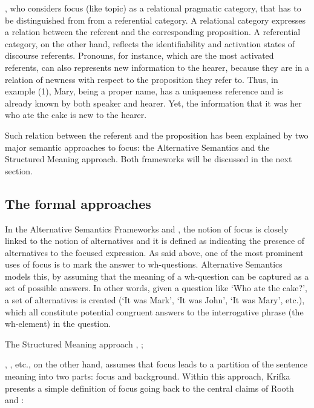 \documentclass[12pt]{report}
\begin{document}
\noindent
\cite{lambrecht1996information}, who considers focus (like topic) as a relational pragmatic category, that has to be distinguished from from a referential category. A relational category expresses a relation between the referent and the corresponding proposition. A referential category, on the other hand, reflects the identifiability and activation states of discourse referents. Pronouns, for instance, which are the most activated referents, can also represents new information to the hearer, because they are in a relation of newness with respect to the proposition they refer to. Thus, in example (1), Mary, being a proper name, has a uniqueness reference and is already known by both speaker and hearer. Yet, the information that it was her who ate the cake is new to the hearer. 

Such relation between the referent and the proposition has been explained by two major semantic approaches to focus: the Alternative Semantics and the Structured Meaning approach. Both frameworks will be discussed in the next section.\\
 
\subsection{The formal approaches} \label{formalapproaches}

In the Alternative Semantics Frameworks \cite{rooth1985association} and \cite{rooth1992theory}, the notion of focus is closely linked to the notion of alternatives and it is defined as indicating the presence of alternatives to the focused expression. As said above, one of the most prominent uses of focus is to mark the answer to wh-questions. Alternative Semantics models this, by assuming that the meaning of a wh-question can be captured as a set of possible answers. In other words, given a question like ‘Who ate the cake?', a set of alternatives is created (‘It was Mark’, ‘It was John', ‘It was Mary’, etc.), which all constitute potential congruent answers to the interrogative phrase (the wh-element) in the question. 

The Structured Meaning approach \cite{von1982structured}, \cite{von1990current};

\noindent
\cite{krifka1991compositional}, \cite{krifka2008basic}, etc., on the other hand, assumes that focus leads to a partition of the sentence meaning into two parts: focus and background. 
Within this approach, Krifka \cite{krifka2008basic} presents a simple definition of focus going back to the central claims of Rooth \cite{rooth1985association} and \cite{rooth1992theory}: 
\end{document}
